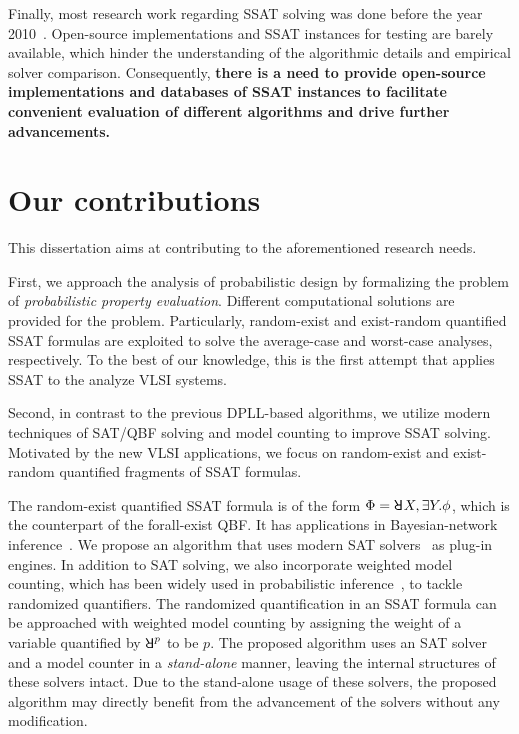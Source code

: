 Finally, most research work regarding SSAT solving was done
before the year 2010~\cite{Majercik1998,Majercik2003,Majercik2004,Majercik2005,Teige2010,SATHandbook-SSAT}.
Open-source implementations and SSAT instances for testing are barely available,
which hinder the understanding of the algorithmic details and empirical solver comparison.
Consequently, \textbf{there is a need to provide open-source implementations and databases of SSAT instances to facilitate convenient evaluation of different algorithms and drive further advancements.}

\section{Our contributions}
This dissertation aims at contributing to the aforementioned research needs.

First, we approach the analysis of probabilistic design by
formalizing the problem of \textit{probabilistic property evaluation}.
Different computational solutions are provided for the problem.
Particularly, random-exist and exist-random quantified SSAT formulas are exploited
to solve the average-case and worst-case analyses, respectively.
To the best of our knowledge,
this is the first attempt that applies SSAT to the analyze VLSI systems.

Second, in contrast to the previous DPLL-based algorithms,
we utilize modern techniques of SAT/QBF solving and model counting to improve SSAT solving.
Motivated by the new VLSI applications,
we focus on random-exist and exist-random quantified fragments of SSAT formulas.

The random-exist quantified SSAT formula is of the form $\Qf=\random{}X,\exists Y.\pf$,
which is the counterpart of the forall-exist QBF.
It has applications in Bayesian-network inference~\cite{Cooper1990,Bacchus2003}.
We propose an algorithm that uses modern SAT solvers~\cite{Een2003Solver,Een2003Incremental} as plug-in engines.
In addition to SAT solving,
we also incorporate weighted model counting,
which has been widely used in probabilistic inference~\cite{Sang2005BayesianInference,Chavira2008},
to tackle randomized quantifiers.
The randomized quantification in an SSAT formula can be approached with weighted model counting
by assigning the weight of a variable quantified by $\random{p}$ to be $p$.
The proposed algorithm uses an SAT solver and a model counter in a \textit{stand-alone} manner,
leaving the internal structures of these solvers intact.
Due to the stand-alone usage of these solvers,
the proposed algorithm may directly benefit from the advancement of the solvers without any modification.


